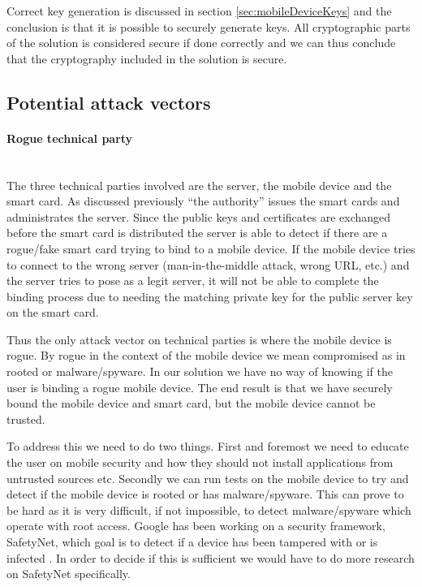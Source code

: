 Correct key generation is discussed in section \ref{sec:mobileDeviceKeys} and the conclusion is that it is possible to securely generate keys. All cryptographic parts of the solution is considered secure if done correctly and we can thus conclude that the cryptography included in the solution is secure.


\subsection{Potential attack vectors}
\label{sec:attackVectors}

\paragraph{Rogue technical party}\mbox{}\\
The three technical parties involved are the server, the mobile device and the smart card. As discussed previously ``the authority'' issues the smart cards and administrates the server. Since the public keys and certificates are exchanged before the smart card is distributed the server is able to detect if there are a rogue/fake smart card trying to bind to a mobile device. If the mobile device tries to connect to the wrong server (man-in-the-middle attack, wrong URL, etc.) and the server tries to pose as a legit server, it will not be able to complete the binding process due to needing the matching private key for the public server key on the smart card.

Thus the only attack vector on technical parties is where the mobile device is rogue. By rogue in the context of the mobile device we mean compromised as in rooted or malware/spyware. In our solution we have no way of knowing if the user is binding a rogue mobile device. The end result is that we have securely bound the mobile device and smart card, but the mobile device cannot be trusted.

To address this we need to do two things. First and foremost we need to educate the user on mobile security and how they should not install applications from untrusted sources etc. Secondly we can run tests on the mobile device to try and detect if the mobile device is rooted or has malware/spyware. This can prove to be hard as it is very difficult, if not impossible, to detect malware/spyware which operate with root access. Google has been working on a security framework, SafetyNet, which goal is to detect if a device has been tampered with or is infected \cite{googleSafetynet}. In order to decide if this is sufficient we would have to do more research on SafetyNet specifically.

